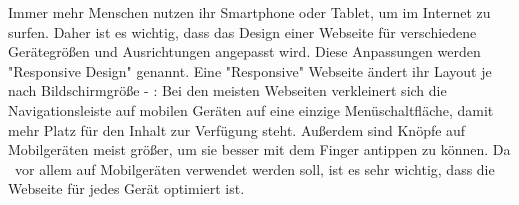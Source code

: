 
Immer mehr Menschen nutzen ihr Smartphone oder Tablet, um im Internet zu surfen. 
Daher ist es wichtig, dass das Design einer Webseite für verschiedene Gerätegrößen und Ausrichtungen angepasst wird. 
Diese Anpassungen werden "Responsive Design" genannt. 
Eine "Responsive" Webseite ändert ihr Layout je nach Bildschirmgröße - \zb: 
Bei den meisten Webseiten verkleinert sich die Navigationsleiste auf mobilen Geräten auf eine einzige Menüschaltfläche, damit mehr Platz für den Inhalt zur Verfügung steht.
Außerdem sind Knöpfe auf Mobilgeräten meist größer, um sie besser mit dem Finger antippen zu können. 
Da \ZELIA\ vor allem auf Mobilgeräten verwendet werden soll, ist es sehr wichtig, dass die Webseite für jedes Gerät optimiert ist. 

